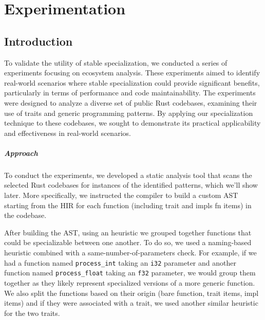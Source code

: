 \chapter{Experimentation}\label{chap:experimentation}


\section{Introduction}\label{sec:experimentation-introduction}
To validate the utility of stable specialization, we conducted a series of experiments focusing on ecosystem analysis.
These experiments aimed to identify real-world scenarios where stable specialization could provide significant benefits, particularly in terms of performance and code maintainability.
The experiments were designed to analyze a diverse set of public Rust codebases, examining their use of traits and generic programming patterns.
By applying our specialization technique to these codebases, we sought to demonstrate its practical applicability and effectiveness in real-world scenarios.

\paragraph{Approach}
To conduct the experiments, we developed a static analysis tool that scans the selected Rust codebases for instances of the identified patterns, which we'll show later.
More specifically, we instructed the compiler to build a custom AST starting from the HIR for each function (including trait and impls fn items) in the codebase.

After building the AST, using an heuristic we grouped together functions that could be specializable between one another.
To do so, we used a naming-based heuristic combined with a same-number-of-parameters check.
For example, if we had a function named \texttt{process\_int} taking an \texttt{i32} parameter and another function named \texttt{process\_float} taking an \texttt{f32} parameter, we would group them together as they likely represent specialized versions of a more generic function.
We also split the functions based on their origin (bare function, trait items, impl items) and if they were associated with a trait, we used another similar heuristic for the two traits.

